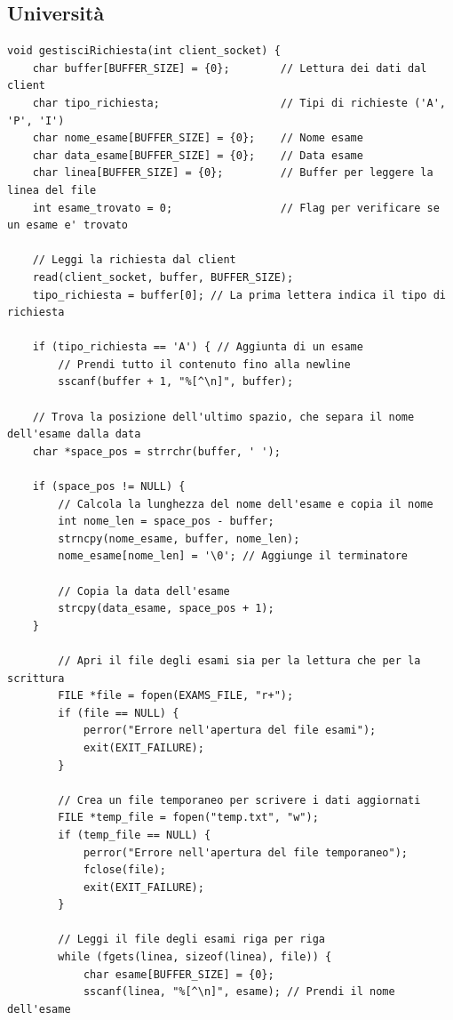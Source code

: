 \documentclass[12pt]{article}
\begin{document}
\subsection{Università}

\begin{lstlisting}[style=CStyle]
void gestisciRichiesta(int client_socket) {
    char buffer[BUFFER_SIZE] = {0};        // Lettura dei dati dal client
    char tipo_richiesta;                   // Tipi di richieste ('A', 'P', 'I')
    char nome_esame[BUFFER_SIZE] = {0};    // Nome esame
    char data_esame[BUFFER_SIZE] = {0};    // Data esame
    char linea[BUFFER_SIZE] = {0};         // Buffer per leggere la linea del file
    int esame_trovato = 0;                 // Flag per verificare se un esame e' trovato

    // Leggi la richiesta dal client
    read(client_socket, buffer, BUFFER_SIZE);
    tipo_richiesta = buffer[0]; // La prima lettera indica il tipo di richiesta

    if (tipo_richiesta == 'A') { // Aggiunta di un esame
        // Prendi tutto il contenuto fino alla newline
        sscanf(buffer + 1, "%[^\n]", buffer); 
        
    // Trova la posizione dell'ultimo spazio, che separa il nome dell'esame dalla data
    char *space_pos = strrchr(buffer, ' ');
    
    if (space_pos != NULL) {
        // Calcola la lunghezza del nome dell'esame e copia il nome
        int nome_len = space_pos - buffer;                
        strncpy(nome_esame, buffer, nome_len);
        nome_esame[nome_len] = '\0'; // Aggiunge il terminatore
        
        // Copia la data dell'esame
        strcpy(data_esame, space_pos + 1);
    }

        // Apri il file degli esami sia per la lettura che per la scrittura
        FILE *file = fopen(EXAMS_FILE, "r+");
        if (file == NULL) {
            perror("Errore nell'apertura del file esami");
            exit(EXIT_FAILURE);
        }

        // Crea un file temporaneo per scrivere i dati aggiornati
        FILE *temp_file = fopen("temp.txt", "w");
        if (temp_file == NULL) {
            perror("Errore nell'apertura del file temporaneo");
            fclose(file);
            exit(EXIT_FAILURE);
        }

        // Leggi il file degli esami riga per riga
        while (fgets(linea, sizeof(linea), file)) {
            char esame[BUFFER_SIZE] = {0};
            sscanf(linea, "%[^\n]", esame); // Prendi il nome dell'esame


\end{lstlisting}
\end{document}
